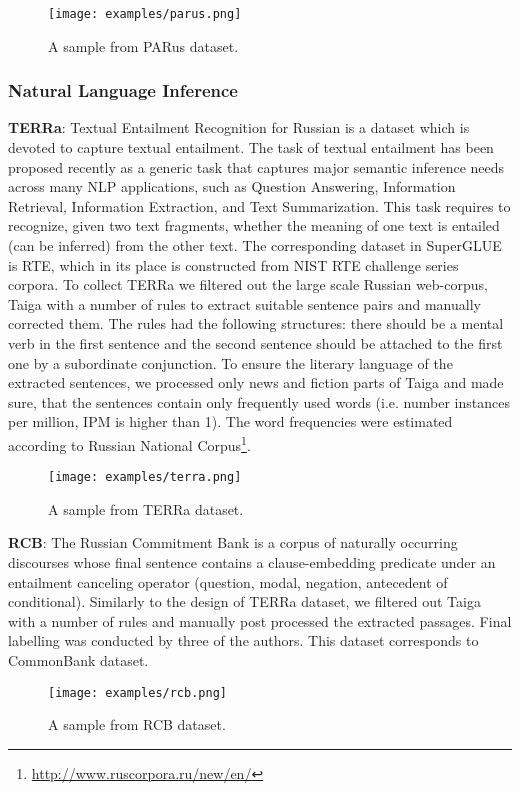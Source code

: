 \documentclass[11pt,a4paper]{article}
\begin{document}
\begin{figure}[ht!]
    \centering
   \texttt{[image: examples/parus.png]}
   \caption{A sample from PARus dataset.}
   \label{fig:sample-parus}
\end{figure}

\subsubsection{Natural Language Inference}

\textbf{TERRa}: Textual Entailment Recognition for Russian is a dataset which is devoted to capture textual entailment. The task of textual entailment has been proposed recently as a generic task that captures major semantic inference needs across many NLP applications, such as Question Answering, Information Retrieval, Information Extraction, and Text Summarization. This task requires to recognize, given two text fragments, whether the meaning of one text is entailed (can be inferred) from the other text.  The corresponding dataset in SuperGLUE is RTE, which in its place is constructed from NIST RTE challenge series corpora. To collect TERRa we filtered out the large scale Russian web-corpus, Taiga \cite{shavrina2017methodology} with a number of rules to extract suitable sentence pairs and manually corrected them. The rules had the following structures: there should be a mental verb in the first sentence and the second sentence should be attached to the first one by a subordinate conjunction. To ensure the 
literary language of the extracted sentences, we processed only news and fiction parts of Taiga and made sure, that the sentences contain only frequently used words (i.e. number instances per million, IPM is higher than 1). The word frequencies were estimated according to Russian National Corpus\footnote{\url{http://www.ruscorpora.ru/new/en/}}. 
\begin{figure}[h!]
    \centering
\texttt{[image: examples/terra.png]}
\caption{A sample from TERRa dataset.}
\label{fig:sample-terra}
\end{figure}

\textbf{RCB}: The Russian Commitment Bank is a corpus of naturally occurring discourses whose final sentence contains a clause-embedding predicate under an entailment canceling operator (question, modal, negation, antecedent of conditional). Similarly to the design of TERRa dataset, we filtered out Taiga with a number of rules and manually post processed the extracted passages.  
Final labelling was conducted by three of the authors. 
This dataset corresponds to CommonBank dataset. 
\begin{figure}[h!]
    \centering
\texttt{[image: examples/rcb.png]}
\caption{A sample from RCB dataset.}
\label{fig:sample-rcb}
\end{figure}
\end{document}
